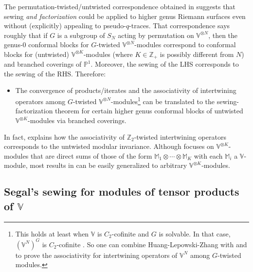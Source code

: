 \documentclass[11pt,b5paper,notitlepage]{article}
\theoremstyle{definition}
\theoremstyle{plain}
\newcommand{\Vbb}{\mathbb V}
\newcommand{\Mbb}{\mathbb M}
\newcommand{\Zbb}{\mathbb Z}
\newcommand{\Pbb}{\mathbb P}
\newcommand{\<}{\left\langle}
\renewcommand{\>}{\right\rangle}
\numberwithin{equation}{section}
\begin{document}
The permutation-twisted/untwisted correspondence obtained in \cite{Gui-permutation} suggests that sewing \textit{and factorization} could be applied to higher genus Riemann surfaces even without (explicitly) appealing to pseudo-$q$-traces. %
That correspondence says roughly that if $G$ is a subgroup of $S_N$ acting by permutation on $\Vbb^{\otimes N}$, then the genus-$0$ conformal blocks for $G$-twisted  $\Vbb^{\otimes N}$-modules correspond to conformal blocks for (untwisted) $\Vbb^{\otimes K}$-modules (where $K\in\Zbb_+$ is possibly different from $N$) and branched coverings of $\Pbb^1$. Moreover, the sewing of the LHS corresponds to the sewing of the RHS. Therefore:
\begin{itemize}
\item The convergence of products/iterates and the associativity of intertwining operators among  $G$-twisted $\Vbb^{\otimes N}$-modules\footnote{This holds at least when $\Vbb$ is $C_2$-cofinite and $G$ is solvable. In that case, $(\Vbb^N)^G$ is $C_2$-cofinite \cite{Miy-C2-orbifold}. So one can combine Huang-Lepowski-Zhang with \cite{Hua-projectivecover} and \cite{McR-equiv} to prove the associativity for intertwining operators of $\Vbb^N$ among $G$-twisted modules. } can be translated to the sewing-factorization theorem for certain higher genus conformal blocks of untwisted $\Vbb^{\otimes K}$-modules via branched coverings.
\end{itemize}
In fact, \cite[Sec. 0.2]{Gui-permutation} explains how the associativity of $\Zbb_2$-twisted intertwining operators corresponds to the untwisted modular invariance. Although \cite{Gui-permutation} focuses on $\Vbb^{\otimes K}$-modules that are direct sums of those of the form $\Mbb_1\otimes\cdots\otimes\Mbb_K$ with each $\Mbb_i$ a $\Vbb$-module, most results in \cite{Gui-permutation} can be easily generalized to arbitrary $\Vbb^{\otimes K}$-modules.


\subsection{Segal's sewing for modules of tensor products of $\Vbb$}\label{lbb65}
\end{document}
